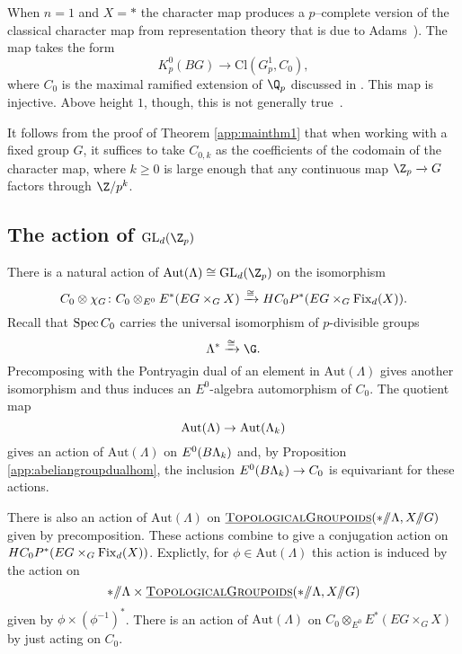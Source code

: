 


\begin{example}
When $n=1$ and $X = *$ the character map produces a $p$--complete version of the classical character map from representation theory that is due to Adams~\cite[Section 2]{Adams-Maps2}). The map takes the form
\[
K_{p}^{0}(BG) \xrightarrow{} \mathrm{Cl}(G_{p}^{1}, C_0),
\]
where $C_0$ is the maximal ramified extension of $\Q_p$ discussed in . This map is injective. Above height $1$, though, this is not generally true~\cite{Kriz}.
\end{example}

\begin{remark}
It follows from the proof of Theorem \ref{app:mainthm1} that when working with a fixed group $G$, it suffices to take $C_{0,k}$ as the coefficients of the codomain of the character map, where $k \geq 0$ is large enough that any continuous map $\Z_p \xrightarrow{} G$ factors through $\Z/p^k$.
\end{remark}

\subsection{The action of $\mathrm{GL}_d(\Z_p)$}

There is a natural action of $\mathrm{Aut}(\Lambda) \cong \mathrm{GL}_d(\Z_p)$ on the isomorphism
\[
C_0 \otimes \chi_G \colon C_0 \otimes_{E^0} E^*(EG \times_G X) \xrightarrow{\cong} HC_{0}P^{*}(EG \times_G \operatorname{Fix}_d(X)).
\]
Recall that $\operatorname{Spec} C_0$ carries the universal isomorphism of $p$-divisible groups
\[
\Lambda^* \xrightarrow{\cong} \G.
\]
Precomposing with the Pontryagin dual of an element in $\mathrm{Aut}(\Lambda)$ gives another isomorphism and thus induces an $E^0$-algebra automorphism of $C_0$. The quotient map
\[
\mathrm{Aut}(\Lambda) \to \mathrm{Aut}(\Lambda_k)
\]  
gives an action of $\mathrm{Aut}(\Lambda)$ on $E^0(B\Lambda_k)$ and, by Proposition \ref{app:abeliangroupdualhom}, the inclusion $E^0(B\Lambda_k) \to C_0$ is equivariant for these actions.

There is also an action of $\mathrm{Aut}(\Lambda)$ on $\operatorname{\underline{\smash{\normalfont\textsc{TopologicalGroupoids}}}}(* /\!\!/ \Lambda, X /\!\!/ G)$ given by precomposition. These actions combine to give a conjugation action on $HC_{0}P^{*}(EG \times_G \operatorname{Fix}_d(X))$. Explictly, for $\phi \in \mathrm{Aut}(\Lambda)$ this action is induced by the action on 
\[
* /\!\!/ \Lambda \times \operatorname{\underline{\smash{\normalfont\textsc{TopologicalGroupoids}}}}(* /\!\!/ \Lambda, X /\!\!/ G)
\]
given by $\phi \times (\phi^{-1})^*$. There is an action of $\mathrm{Aut}(\Lambda)$ on $C_0 \otimes_{E^0} E^*(EG \times_G X)$ by just acting on $C_0$.



